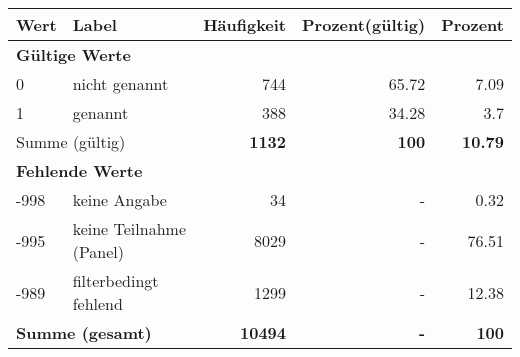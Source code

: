      \begin{longtable}{lXrrr}
     \toprule
     \textbf{Wert} & \textbf{Label} & \textbf{Häufigkeit} & \textbf{Prozent(gültig)} & \textbf{Prozent} \\
     \endhead
     \midrule
     \multicolumn{5}{l}{\textbf{Gültige Werte}}\\

     0 &
     \multicolumn{1}{X}{ nicht genannt   } &


       \num{744} &
       \num[round-mode=places,round-precision=2]{65.72} &
         \num[round-mode=places,round-precision=2]{7.09} \\

     1 &
     \multicolumn{1}{X}{ genannt   } &


       \num{388} &
       \num[round-mode=places,round-precision=2]{34.28} &
         \num[round-mode=places,round-precision=2]{3.7} \\
     \midrule
     \multicolumn{2}{l}{Summe (gültig)} &
       \textbf{\num{1132}} &
     \textbf{\num{100}} &
       \textbf{\num[round-mode=places,round-precision=2]{10.79}} \\
     \multicolumn{5}{l}{\textbf{Fehlende Werte}}\\
       -998 &
       keine Angabe &
         \num{34} &
        - &
         \num[round-mode=places,round-precision=2]{0.32} \\
       -995 &
       keine Teilnahme (Panel) &
         \num{8029} &
        - &
         \num[round-mode=places,round-precision=2]{76.51} \\
       -989 &
       filterbedingt fehlend &
         \num{1299} &
        - &
         \num[round-mode=places,round-precision=2]{12.38} \\
     \midrule
     \multicolumn{2}{l}{\textbf{Summe (gesamt)}} &
          \textbf{\num{10494}} &
        \textbf{-} &
        \textbf{\num{100}} \\
     \bottomrule
     \end{longtable}
     
